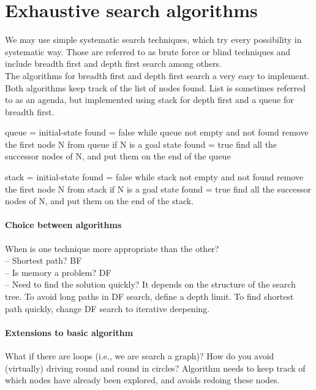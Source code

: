 \section{Exhaustive search algorithms}
We may use simple systematic search techniques, which try every possibility in systematic way. Those are referred to as brute force or blind techniques and include breadth first and depth first search among others.\\
\linebreak
The algorithms for breadth first and depth first search a very easy to implement. Both algorithms keep track of the list of nodes found. List is sometimes referred to as an agenda, but implemented using stack for depth first and a queue for breadth first.
\begin{algorithm}[caption={Breadth-first search.}, label={alg1}]
queue = {initial-state}
found = false
while queue not empty and not found
    remove the first node N from queue
    if N is a goal state
        found = true
    find all the successor nodes of N, and put them on the end of the queue
\end{algorithm}

\begin{algorithm}[caption={Depth-first search.}, label={alg2}]
stack = {initial-state}
found = false
while stack not empty and not found
    remove the first node N from stack
    if N is a goal state
        found = true
    find all the successor nodes of N, and put them on the end of the stack.
\end{algorithm}

\paragraph{Choice between algorithms} When is one technique more appropriate than the other? \\
– Shortest path? BF \\
– Is memory a problem? DF \\
– Need to find the solution quickly? It depends on the structure of the search tree. To avoid long paths in DF search, define a depth limit. To find shortest path quickly, change DF search to iterative deepening.

\paragraph{Extensions to basic algorithm} What if there are loops (i.e., we are search a graph)? How do you avoid (virtually) driving round and round in circles? Algorithm needs to keep track of which nodes have already been explored, and avoids redoing these nodes.

